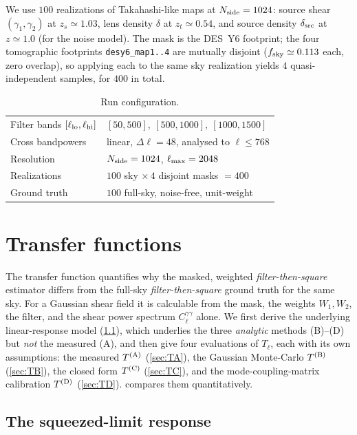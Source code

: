 \documentclass[11pt]{article}
\newcommand{\Wone}{W_1}
\newcommand{\Wtwo}{W_2}
\newcommand{\dt}{\delta}
\begin{document}
We use $100$ realizations of Takahashi-like maps at $N_{\rm side}=1024$:
source shear $(\gamma_1,\gamma_2)$ at $z_s\simeq1.03$, lens density $\dt$ at
$z_t\simeq0.54$, and source density $\delta_{\rm src}$ at $z\simeq1.0$ (for the
noise model). The mask is the DES~Y6 footprint; the four tomographic footprints
\texttt{desy6\_map1..4} are mutually disjoint ($f_{\rm sky}\simeq0.113$ each,
zero overlap), so applying each to the same sky realization yields $4$
quasi-independent samples, for $400$ in total.

\begin{table}[h]
\centering
\begin{tabular}{ll}
\toprule
Filter bands $[\ell_{\rm lo},\ell_{\rm hi}]$ & $[50,500],\ [500,1000],\ [1000,1500]$\\
Cross bandpowers & linear, $\Delta\ell=48$, analysed to $\ell\le768$\\
Resolution & $N_{\rm side}=1024$, $\ell_{\rm max}=2048$\\
Realizations & $100$ sky $\times\,4$ disjoint masks $=400$\\
Ground truth & $100$ full-sky, noise-free, unit-weight\\
\bottomrule
\end{tabular}
\caption{Run configuration.}
\end{table}

\section{Transfer functions}\label{sec:transfer}

The transfer function quantifies why the masked, weighted
\emph{filter-then-square} estimator differs from the full-sky
\emph{filter-then-square} ground truth for the same sky. For a Gaussian shear
field it is calculable from the mask, the weights $\Wone,\Wtwo$, the filter,
and the shear power spectrum $C^{\gamma\gamma}_\ell$ alone. We first derive the
underlying linear-response model (\cref{sec:response}), which underlies the three
\emph{analytic} methods (B)--(D) but \emph{not} the measured (A), and then give
four evaluations of $T_\ell$, each with its own
assumptions: the measured $T^{\rm (A)}$ (\cref{sec:TA}), the Gaussian
Monte-Carlo $T^{\rm (B)}$ (\cref{sec:TB}), the closed form $T^{\rm (C)}$
(\cref{sec:TC}), and the mode-coupling-matrix calibration $T^{\rm (D)}$
(\cref{sec:TD}).  compares them quantitatively.

\subsection{The squeezed-limit response}\label{sec:response}
\end{document}
